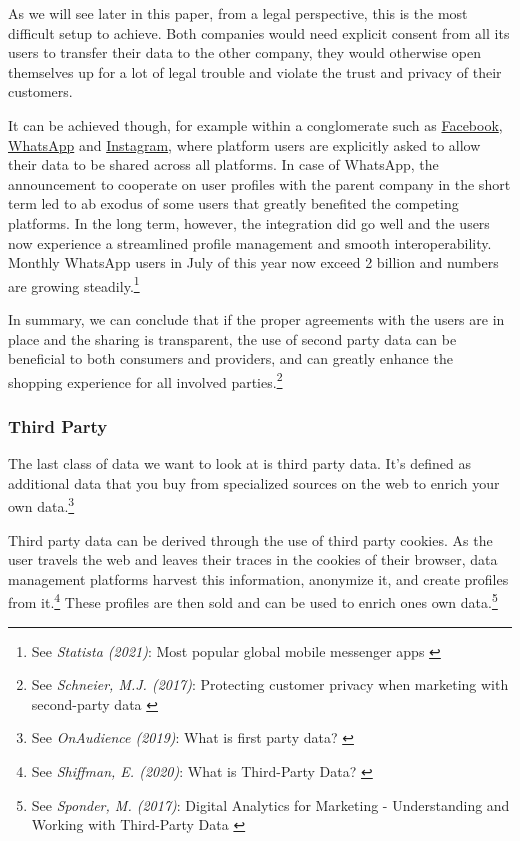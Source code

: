 As we will see later in this paper, from a legal perspective, this is the most difficult setup to achieve. Both companies would need explicit consent from all its users to transfer their data to the other company, they would otherwise open themselves up for a lot of legal trouble and violate the trust and privacy of their customers.

It can be achieved though, for example within a conglomerate such as \href{https://www.facebook.com/}{Facebook}, \href{https://www.whatsapp.com/}{WhatsApp} and \href{https://www.instagram.com/}{Instagram}, where platform users are explicitly asked to allow their data to be shared across all platforms. In case of WhatsApp, the announcement to cooperate on user profiles with the parent company in the short term led to ab exodus of some users that greatly benefited the competing platforms. In the long term, however, the integration did go well and the users now experience a streamlined profile management and smooth interoperability. Monthly WhatsApp users in July of this year now exceed 2 billion and numbers are growing steadily.\footnote{See \textit{Statista (2021)}: Most popular global mobile messenger apps \cite{whatsStats}}

In summary, we can conclude that if the proper agreements with the users are in place and the sharing is transparent, the use of second party data can be beneficial to both consumers and providers, and can greatly enhance the shopping experience for all involved parties.\footnote{See \textit{Schneier, M.J. (2017)}: Protecting customer privacy when marketing with second-party data \cite{secondParty}}

\subsubsection{Third Party}

The last class of data we want to look at is third party data. It's defined as additional data that you buy from specialized sources on the web to enrich your own data.\footnote{See \textit{OnAudience (2019)}: What is first party data? \cite{firstParty}}

Third party data can be derived through the use of third party cookies. As the user travels the web and leaves their traces in the cookies of their browser, data management platforms harvest this information, anonymize it, and create profiles from it.\footnote{See \textit{Shiffman, E. (2020)}: What is Third-Party Data? \cite{thirdParty}} These profiles are then sold and can be used to enrich ones own data.\footnote{See \textit{Sponder, M. (2017)}: Digital Analytics for Marketing - Understanding and Working with Third-Party Data \cite{digitalAnalytics}}

